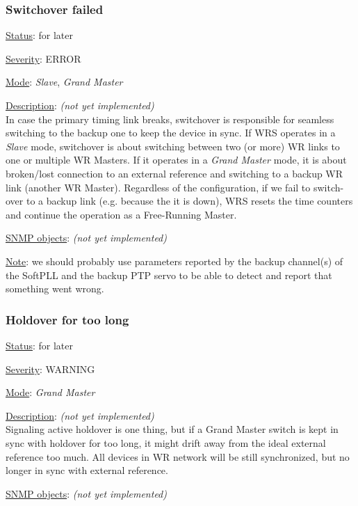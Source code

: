 \subsubsection{\bf Switchover failed}
		\begin{packed_enum}
			\item [] \underline{Status}: for later
			\item [] \underline{Severity}: ERROR
			\item [] \underline{Mode}: \emph{Slave}, \emph{Grand Master}
			\item [] \underline{Description}: \emph{(not yet implemented)}\\
				In case the primary timing link breaks, switchover is responsible for
				seamless switching to the backup one to keep the device in sync. If WRS
				operates in a \emph{Slave} mode, switchover is about switching
				between two (or more) WR links to one or multiple WR Masters. If it
				operates in a \emph{Grand Master} mode, it is about broken/lost
				connection to an external reference and switching to a backup WR link
				(another WR Master). Regardless of the configuration, if we fail to
				switch-over to a backup link (e.g. because the it is down), WRS resets
				the time counters and continue the operation as a Free-Running Master.
			\item [] \underline{SNMP objects}: \emph{(not yet implemented)}
			\item [] \underline{Note}: we should probably use parameters reported by
				the backup channel(s) of the SoftPLL and the backup PTP servo to be able
				to detect and report that something went wrong.
		\end{packed_enum}

\subsubsection{\bf Holdover for too long}
		\begin{packed_enum}
			\item [] \underline{Status}: for later
			\item [] \underline{Severity}: WARNING
			\item [] \underline{Mode}: \emph{Grand Master}
			\item [] \underline{Description}: \emph{(not yet implemented)}\\
				Signaling active holdover is one thing, but if a Grand Master switch is
				kept in sync with holdover for too long, it might drift away from the
				ideal external reference too much. All devices in WR network will be
				still synchronized, but no longer in sync with external reference.
			\item [] \underline{SNMP objects}: \emph{(not yet implemented)}
		\end{packed_enum}

